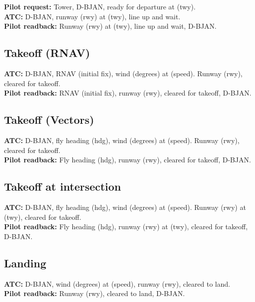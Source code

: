 \documentclass{article}
\newcommand{\callsign}{D-BJAN}
\begin{document}
\textbf{Pilot request:} Tower, \callsign, ready for departure at (twy). \\

\textbf{ATC:} \callsign, runway (rwy) at (twy), line up and wait. \\

\textbf{Pilot readback:} Runway (rwy) at (twy), line up and wait, \callsign.

\subsection*{Takeoff (RNAV)}

\textbf{ATC:} \callsign, RNAV (initial fix), wind (degrees) at (speed). Runway (rwy), cleared for takeoff. \\

\textbf{Pilot readback:} RNAV (initial fix), runway (rwy), cleared for takeoff, \callsign.

\subsection*{Takeoff (Vectors)}

\textbf{ATC:} \callsign, fly heading (hdg), wind (degrees) at (speed). Runway (rwy), cleared for takeoff. \\

\textbf{Pilot readback:} Fly heading (hdg), runway (rwy), cleared for takeoff, \callsign.

\subsection*{Takeoff at intersection}

\textbf{ATC:} \callsign, fly heading (hdg), wind (degrees) at (speed). Runway (rwy) at (twy), cleared for takeoff. \\

\textbf{Pilot readback:} Fly heading (hdg), runway (rwy) at (twy), cleared for takeoff, \callsign.

\subsection*{Landing}

\textbf{ATC:} \callsign, wind (degrees) at (speed), runway (rwy), cleared to land. \\

\textbf{Pilot readback:} Runway (rwy), cleared to land, \callsign.
\end{document}
